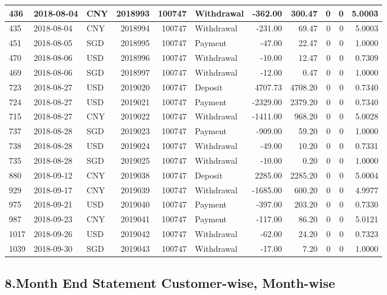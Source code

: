 \documentclass[]{article}
\begin{document}
\begin{table}[H]
\begin{tabular}{l|l|l|r|r|l|r|r|r|r|r}
\hline
436 & 2018-08-04 & CNY & 2018993 & 100747 & Withdrawal & -362.00 & 300.47 & 0 & 0 & 5.0003\\
\hline
435 & 2018-08-04 & CNY & 2018994 & 100747 & Withdrawal & -231.00 & 69.47 & 0 & 0 & 5.0003\\
\hline
451 & 2018-08-05 & SGD & 2018995 & 100747 & Payment & -47.00 & 22.47 & 0 & 0 & 1.0000\\
\hline
470 & 2018-08-06 & USD & 2018996 & 100747 & Withdrawal & -10.00 & 12.47 & 0 & 0 & 0.7309\\
\hline
469 & 2018-08-06 & SGD & 2018997 & 100747 & Withdrawal & -12.00 & 0.47 & 0 & 0 & 1.0000\\
\hline
723 & 2018-08-27 & USD & 2019020 & 100747 & Deposit & 4707.73 & 4708.20 & 0 & 0 & 0.7340\\
\hline
724 & 2018-08-27 & USD & 2019021 & 100747 & Payment & -2329.00 & 2379.20 & 0 & 0 & 0.7340\\
\hline
715 & 2018-08-27 & CNY & 2019022 & 100747 & Withdrawal & -1411.00 & 968.20 & 0 & 0 & 5.0028\\
\hline
737 & 2018-08-28 & SGD & 2019023 & 100747 & Payment & -909.00 & 59.20 & 0 & 0 & 1.0000\\
\hline
738 & 2018-08-28 & USD & 2019024 & 100747 & Withdrawal & -49.00 & 10.20 & 0 & 0 & 0.7331\\
\hline
735 & 2018-08-28 & SGD & 2019025 & 100747 & Withdrawal & -10.00 & 0.20 & 0 & 0 & 1.0000\\
\hline
880 & 2018-09-12 & CNY & 2019038 & 100747 & Deposit & 2285.00 & 2285.20 & 0 & 0 & 5.0004\\
\hline
929 & 2018-09-17 & CNY & 2019039 & 100747 & Withdrawal & -1685.00 & 600.20 & 0 & 0 & 4.9977\\
\hline
975 & 2018-09-21 & USD & 2019040 & 100747 & Payment & -397.00 & 203.20 & 0 & 0 & 0.7330\\
\hline
987 & 2018-09-23 & CNY & 2019041 & 100747 & Payment & -117.00 & 86.20 & 0 & 0 & 5.0121\\
\hline
1017 & 2018-09-26 & USD & 2019042 & 100747 & Withdrawal & -62.00 & 24.20 & 0 & 0 & 0.7323\\
\hline
1039 & 2018-09-30 & SGD & 2019043 & 100747 & Withdrawal & -17.00 & 7.20 & 0 & 0 & 1.0000\\
\hline
\end{tabular}
\end{table}

\subsection{8.Month End Statement Customer-wise,
Month-wise}\label{month-end-statement-customer-wise-month-wise}
\end{document}
